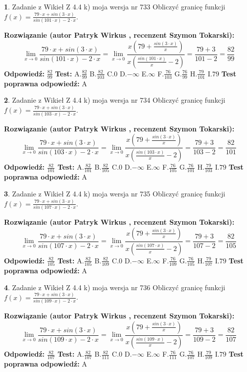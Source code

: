 \documentclass[12pt, a4paper]{article}
\theoremstyle{definition} %
\newtheorem{zad}{}
\newcommand{\zadStart}[1]{\begin{zad}#1\newline}
\newcommand{\zadStop}{\end{zad}}
\newcommand{\rozwStart}[2]{\noindent \textbf{Rozwiązanie (autor #1 , recenzent #2): }\newline}
\newcommand{\rozwStop}{\newline}
\newcommand{\odpStart}{\noindent \textbf{Odpowiedź:}\newline}
\newcommand{\odpStop}{\newline}
\newcommand{\testStart}{\noindent \textbf{Test:}\newline}
\newcommand{\testStop}{\newline}
\newcommand{\kluczStart}{\noindent \textbf{Test poprawna odpowiedź:}\newline}
\newcommand{\kluczStop}{\newline}
\begin{document}
\zadStart{Zadanie z Wikieł Z 4.4 k) moja wersja nr 733}
Obliczyć granicę funkcji $f(x)=\frac{79\cdot x +sin(3\cdot x)}{sin(101\cdot x) -2\cdot x}$.
\zadStop
\rozwStart{Patryk Wirkus}{Szymon Tokarski}
$$\lim\limits_{x\to 0}\frac{79\cdot x +sin(3\cdot x)}{sin(101\cdot x) -2\cdot x}
=\lim\limits_{x\to 0}\frac{x(79+\frac{sin(3\cdot x)}{x})}{x(\frac{sin(101\cdot x)}{x}-2)}
=\frac{79+3}{101-2} = \frac{82}{99}$$
\rozwStop
\odpStart
$\frac{82}{99}$
\odpStop
\testStart
A.$\frac{82}{99}$
B.$\frac{82}{103}$
C.$0$
D.$-\infty$
E.$\infty$
F.$\frac{76}{103}$
G.$\frac{76}{99}$
H.$\frac{79}{101}$
I.$79$
\testStop
\kluczStart
A
\kluczStop



\zadStart{Zadanie z Wikieł Z 4.4 k) moja wersja nr 734}
Obliczyć granicę funkcji $f(x)=\frac{79\cdot x +sin(3\cdot x)}{sin(103\cdot x) -2\cdot x}$.
\zadStop
\rozwStart{Patryk Wirkus}{Szymon Tokarski}
$$\lim\limits_{x\to 0}\frac{79\cdot x +sin(3\cdot x)}{sin(103\cdot x) -2\cdot x}
=\lim\limits_{x\to 0}\frac{x(79+\frac{sin(3\cdot x)}{x})}{x(\frac{sin(103\cdot x)}{x}-2)}
=\frac{79+3}{103-2} = \frac{82}{101}$$
\rozwStop
\odpStart
$\frac{82}{101}$
\odpStop
\testStart
A.$\frac{82}{101}$
B.$\frac{82}{105}$
C.$0$
D.$-\infty$
E.$\infty$
F.$\frac{76}{105}$
G.$\frac{76}{101}$
H.$\frac{79}{103}$
I.$79$
\testStop
\kluczStart
A
\kluczStop



\zadStart{Zadanie z Wikieł Z 4.4 k) moja wersja nr 735}
Obliczyć granicę funkcji $f(x)=\frac{79\cdot x +sin(3\cdot x)}{sin(107\cdot x) -2\cdot x}$.
\zadStop
\rozwStart{Patryk Wirkus}{Szymon Tokarski}
$$\lim\limits_{x\to 0}\frac{79\cdot x +sin(3\cdot x)}{sin(107\cdot x) -2\cdot x}
=\lim\limits_{x\to 0}\frac{x(79+\frac{sin(3\cdot x)}{x})}{x(\frac{sin(107\cdot x)}{x}-2)}
=\frac{79+3}{107-2} = \frac{82}{105}$$
\rozwStop
\odpStart
$\frac{82}{105}$
\odpStop
\testStart
A.$\frac{82}{105}$
B.$\frac{82}{109}$
C.$0$
D.$-\infty$
E.$\infty$
F.$\frac{76}{109}$
G.$\frac{76}{105}$
H.$\frac{79}{107}$
I.$79$
\testStop
\kluczStart
A
\kluczStop



\zadStart{Zadanie z Wikieł Z 4.4 k) moja wersja nr 736}
Obliczyć granicę funkcji $f(x)=\frac{79\cdot x +sin(3\cdot x)}{sin(109\cdot x) -2\cdot x}$.
\zadStop
\rozwStart{Patryk Wirkus}{Szymon Tokarski}
$$\lim\limits_{x\to 0}\frac{79\cdot x +sin(3\cdot x)}{sin(109\cdot x) -2\cdot x}
=\lim\limits_{x\to 0}\frac{x(79+\frac{sin(3\cdot x)}{x})}{x(\frac{sin(109\cdot x)}{x}-2)}
=\frac{79+3}{109-2} = \frac{82}{107}$$
\rozwStop
\odpStart
$\frac{82}{107}$
\odpStop
\testStart
A.$\frac{82}{107}$
B.$\frac{82}{111}$
C.$0$
D.$-\infty$
E.$\infty$
F.$\frac{76}{111}$
G.$\frac{76}{107}$
H.$\frac{79}{109}$
I.$79$
\testStop
\kluczStart
A
\kluczStop
\end{document}
